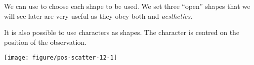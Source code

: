 \documentclass[krantz2]{krantz}\usepackage{knitr}%
\begin{document}
We can use  to choose each shape to be used. We set three ``open'' shapes that we will see later are very useful as they obey both  and  \emph{aesthetics}.\label{chunk:filled:symbols}

\begin{knitrout}\footnotesize
{}\color{fgcolor}\begin{kframe}
\begin{alltt}
\hlstd{(}  \hlstd{(}     \hlstd{=}  \hlopt{+}
  \hlstd{()} \hlopt{+}
  \hlstd{(} \hlstd{=} \hlstd{(}\hlstd{,} \hlstd{,} \hlstd{))}
\end{alltt}
\end{kframe}
\end{knitrout}

It is also possible to use characters as shapes. The character is centred on the position of the observation.
\begin{knitrout}\footnotesize
{}\color{fgcolor}\begin{kframe}
\begin{alltt}
\hlstd{(}  \hlstd{(}     \hlstd{=}  \hlopt{+}
  \hlstd{(} \hlstd{=} \hlstd{)} \hlopt{+}
  \hlstd{(} \hlstd{=} \hlstd{(}\hlstd{,} \hlstd{,} \hlstd{),}  \hlstd{=} \hlstd{)}
\end{alltt}
\end{kframe}

{\centering \texttt{[image: figure/pos-scatter-12-1]} 

}



\end{knitrout}
\end{document}
